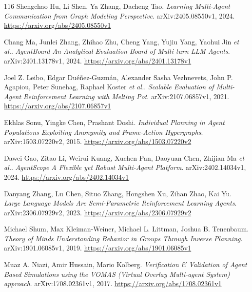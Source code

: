 \documentclass[11pt,a4paper]{article}
\begin{document}
\begin{thebibliography}{116}
Shengchao Hu, Li Shen, Ya Zhang, Dacheng Tao.
\newblock \emph{Learning Multi-Agent Communication from Graph Modeling Perspective}.
\newblock arXiv:2405.08550v1, 2024.
\newblock \url{https://arxiv.org/abs/2405.08550v1}

Chang Ma, Junlei Zhang, Zhihao Zhu, Cheng Yang, Yujiu Yang, Yaohui Jin \emph{et al.}.
\newblock \emph{AgentBoard An Analytical Evaluation Board of Multi-turn LLM Agents}.
\newblock arXiv:2401.13178v1, 2024.
\newblock \url{https://arxiv.org/abs/2401.13178v1}

Joel Z. Leibo, Edgar Du\'{e}\~{n}ez-Guzm\'{a}n, Alexander Sasha Vezhnevets, John P. Agapiou, Peter Sunehag, Raphael Koster \emph{et al.}.
\newblock \emph{Scalable Evaluation of Multi-Agent Reinforcement Learning with Melting Pot}.
\newblock arXiv:2107.06857v1, 2021.
\newblock \url{https://arxiv.org/abs/2107.06857v1}

Ekhlas Sonu, Yingke Chen, Prashant Doshi.
\newblock \emph{Individual Planning in Agent Populations Exploiting Anonymity and Frame-Action Hypergraphs}.
\newblock arXiv:1503.07220v2, 2015.
\newblock \url{https://arxiv.org/abs/1503.07220v2}

Dawei Gao, Zitao Li, Weirui Kuang, Xuchen Pan, Daoyuan Chen, Zhijian Ma \emph{et al.}.
\newblock \emph{AgentScope A Flexible yet Robust Multi-Agent Platform}.
\newblock arXiv:2402.14034v1, 2024.
\newblock \url{https://arxiv.org/abs/2402.14034v1}

Danyang Zhang, Lu Chen, Situo Zhang, Hongshen Xu, Zihan Zhao, Kai Yu.
\newblock \emph{Large Language Models Are Semi-Parametric Reinforcement Learning Agents}.
\newblock arXiv:2306.07929v2, 2023.
\newblock \url{https://arxiv.org/abs/2306.07929v2}

Michael Shum, Max Kleiman-Weiner, Michael L. Littman, Joshua B. Tenenbaum.
\newblock \emph{Theory of Minds Understanding Behavior in Groups Through Inverse Planning}.
\newblock arXiv:1901.06085v1, 2019.
\newblock \url{https://arxiv.org/abs/1901.06085v1}

Muaz A. Niazi, Amir Hussain, Mario Kolberg.
\newblock \emph{Verification \& Validation of Agent Based Simulations using the VOMAS (Virtual Overlay Multi-agent System) approach}.
\newblock arXiv:1708.02361v1, 2017.
\newblock \url{https://arxiv.org/abs/1708.02361v1}


\end{thebibliography}
\end{document}
